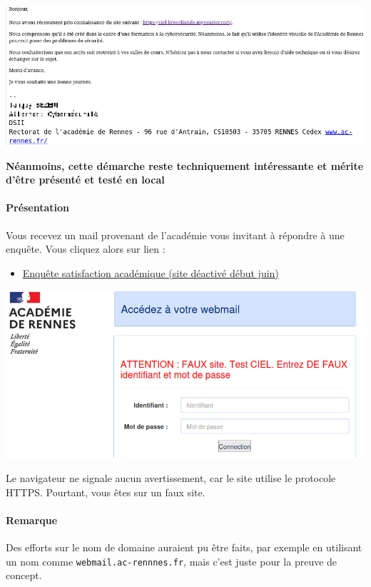 \documentclass[french, 12pt]{article}%
\newcommand{\itemE}{\item[$\bullet$]}
\begin{document}
\begin{center}
\includegraphics[scale=0.5]{./ressource/mailRssi}
\end{center}
\textbf{Néanmoins, cette démarche reste techniquement intéressante et mérite d'être présenté et testé en local}

\paragraph{Présentation}

Vous recevez un mail provenant de l'académie vous invitant à répondre à une enquête.  Vous cliquez alors sur lien  :

\begin{itemize}
  \itemE \href{https://ciel-broceliande.myasustor.commm}{Enquête satisfaction académique (site déactivé début juin)} 
\end{itemize}

\begin{center}
\includegraphics[scale=0.5]{./ressource/fauxSite}
\end{center}

Le navigateur ne signale aucun avertissement, car le site utilise le protocole HTTPS.  Pourtant, vous êtes sur un faux site.

\paragraph{Remarque}  
Des efforts sur le nom de domaine auraient pu être faits, par exemple en utilisant un nom comme \verb?webmail.ac-rennnes.fr?, mais c'est juste pour la preuve de concept.
\end{document}
